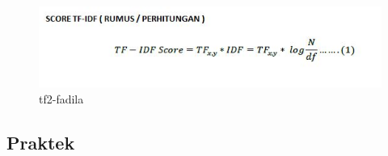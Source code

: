 \begin{enumerate}
\begin{itemize}
\begin{figure}[!hbtp]
\centering
\includegraphics[scale=0.4]{figures/tf2-fadila.jpg}
\caption{tf2-fadila}
\label{tf2-fadila}
\end{figure}
\par
\par
\end{itemize}
\par
\par

\end{enumerate}

\subsection{Praktek}